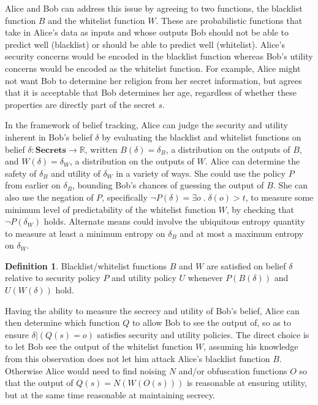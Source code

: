 \documentclass{article} %
\newcommand{\pxm}[1]{}
\newcommand{\ra}{\rightarrow}
\newcommand{\Real}{\mathbb{R}}
\newcommand{\secrets}[0]{\textbf{Secrets}}
\newcommand{\paren}[1]{\left( #1 \right)}
\newcommand{\cond}[0]{|}
\newcommand{\qsep}[0]{\; . \;}
\theoremstyle{plain} %
\theoremstyle{definition} %
\newtheorem*{definition-un}{Definition}
\begin{document}
Alice and Bob can address this issue by agreeing to two functions, the
blacklist function $ B $ and the whitelist function $ W $. These are
probabilistic functions that take in Alice's data as inputs and whose
outputs Bob should not be able to predict well (blacklist) or should
be able to predict well (whitelist). Alice's security concerns would
be encoded in the blacklist function whereas Bob's utility concerns
would be encoded as the whitelist function. For example, Alice might
not want Bob to determine her religion from her secret information,
but agrees that it is acceptable that Bob determines her age,
regardless of whether these properties are directly part of the secret
$ s $.

In the framework of belief tracking, Alice can judge the security and
utility inherent in Bob's belief $ \delta $ by evaluating the
blacklist and whitelist functions on belief $ \delta : \secrets \ra
\Real $, written $ B(\delta) = \delta_B $, a distribution on the
outputs of $ B $, and $ W(\delta) = \delta_W$, a distribution on the
outputs of $ W $. Alice can determine the safety of $ \delta_B $ and utility of $
\delta_W $ in a variety of ways. She could use the policy $ P $ from
earlier on $ \delta_B $, bounding Bob's chances of guessing the output
of $ B $. She can also use the negation of $ P $, specifically $ \neg
P(\delta) = \exists o \qsep \delta(o) > t $, to measure some minimum
level of predictability of the whitelist function $ W $, by checking
that $ \neg P(\delta_W) $ holds. Alternate means could involve the
ubiquitous entropy quantity to measure at least a minimum entropy on $
\delta_B $ and at most a maximum entropy on $ \delta_W $.

\pxm{todo: There's an issue of accuracy of belief vs. uncertainty of belief. }

\pxm{todo: $ U(\delta) $ is not explicitly defined}

\begin{definition-un} Blacklist/whitelist functions $ B $ and $ W $
  are satisfied on belief $ \delta $ relative to security policy $ P $
  and utility policy $  U $ whenever $P(B(\delta))$ and $U(W(\delta))$ hold.
\end{definition-un}

Having the ability to measure the secrecy and utility of Bob's belief,
Alice can then determine which function $ Q $ to allow Bob to see the
output of, so as to ensure $ \delta \cond \paren{Q(s) = o} $ satisfies
security and utility policies. The direct choice is to let Bob see the
output of the whitelist function $ W $, assuming his knowledge from
this observation does not let him attack Alice's blacklist function $
B $. Otherwise Alice would need to find noising $ N $ and/or
obfuscation functions $ O $ so that the output of $ Q(s) = N(W(O(s)))
$ is reasonable at ensuring utility, but at the same time reasonable
at maintaining secrecy.
\end{document}

